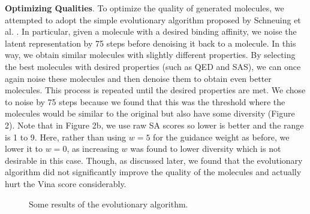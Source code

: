 \documentclass[11pt]{article}
\begin{document}
\textbf{Optimizing Qualities}. 
To optimize the quality of generated molecules, we attempted to adopt the
simple evolutionary algorithm proposed by Schneuing et al. 
\cite{schneuing2023}. In particular, given a molecule with 
a desired binding affinity, we noise the latent representation 
by 75 steps before denoising it back to a molecule. In this 
way, we obtain similar molecules with slightly different properties.
By selecting the best molecules with desired properties (such as QED 
and SAS), we can once again noise these molecules and then denoise them
to obtain even better molecules. This process is repeated until 
the desired properties are met. We chose to noise by 75 steps because 
we found that this was the threshold where the molecules would be 
similar to the original but also have some diversity (Figure 2). Note that in Figure 2b, 
we use raw SA scores so lower is better and the range is 1 to 9.
Here, rather than using $w = 5$ for the guidance weight 
as before, we lower it to $w = 0$, as increasing $w$ was found to lower diversity 
which is not desirable in this case. Though, as discussed later, we found that 
the evolutionary algorithm did not significantly improve the quality of the molecules 
and actually hurt the Vina score considerably.

\begin{figure}[H]
    \centering
    \caption{Some results of the evolutionary algorithm.}
    \label{fig:main}
\end{figure}
\end{document}
